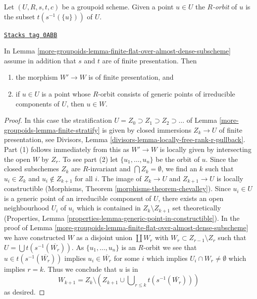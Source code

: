 Let $(U, R, s, t, c)$ be a groupoid scheme. Given a point $u \in U$
the {\it $R$-orbit} of $u$ is the subset $t(s^{-1}(\{u\}))$ of $U$.

\begin{lemma}
\label{more-groupoids-lemma-finite-flat-over-almost-dense-subscheme-addendum}
\href{https://stacks.math.columbia.edu/tag/0ABB}{\texttt{Stacks tag 0ABB}}

In Lemma \ref{more-groupoids-lemma-finite-flat-over-almost-dense-subscheme}
assume in addition that $s$ and $t$ are of finite presentation.
Then
\begin{enumerate}
\item the morphism $W' \to W$ is of finite presentation, and
\item if $u \in U$ is a point whose $R$-orbit consists of
generic points of irreducible components of $U$, then $u \in W$.
\end{enumerate}
\end{lemma}

\begin{proof}
In this case the stratification
$U = Z_0 \supset Z_1 \supset Z_2 \supset \ldots$ of
Lemma \ref{more-groupoids-lemma-finite-stratify} is given by closed immersions $Z_k \to U$
of finite presentation, see
Divisors, Lemma \ref{divisors-lemma-locally-free-rank-r-pullback}.
Part (1) follows immediately from this as $W' \to W$ is locally given
by intersecting the open $W$ by $Z_r$. To see part (2)
let $\{u_1, \ldots, u_n\}$ be the orbit of $u$.
Since the closed subschemes $Z_k$ are $R$-invariant and
$\bigcap Z_k = \emptyset$, we find an $k$ such that $u_i \in Z_k$
and $u_i \not \in Z_{k + 1}$ for all $i$.
The image of $Z_k \to U$ and $Z_{k + 1} \to U$ is locally constructible
(Morphisms, Theorem \ref{morphisms-theorem-chevalley}).
Since $u_i \in U$ is a generic point of an irreducible component
of $U$, there exists an open neighbourhood $U_i$ of $u_i$ which
is contained in $Z_k \setminus Z_{k + 1}$ set theoretically
(Properties, Lemma \ref{properties-lemma-generic-point-in-constructible}).
In the proof of Lemma \ref{more-groupoids-lemma-finite-flat-over-almost-dense-subscheme}
we have constructed $W$ as a disjoint union $\coprod W_r$
with $W_r \subset Z_{r - 1} \setminus Z_r$ such that
$U = \bigcup t(s^{-1}(\overline{W_r}))$. As $\{u_1, \ldots, u_n\}$
is an $R$-orbit we see that $u \in t(s^{-1}(\overline{W_r}))$
implies $u_i \in \overline{W_r}$ for some $i$ which implies
$U_i \cap W_r \not = \emptyset$ which implies $r = k$.
Thus we conclude that $u$ is in
$$
W_{k + 1} = Z_k \setminus
\left(
Z_{k + 1} \cup \bigcup\nolimits_{r \leq k} t(s^{-1}(\overline{W_r}))
\right)
$$
as desired.
\end{proof}

